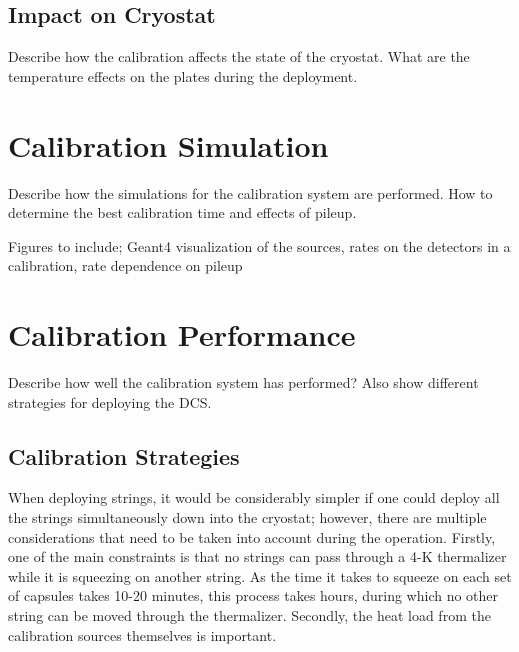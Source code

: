 \subsection{Impact on Cryostat}

Describe how the calibration affects the state of the cryostat. What are the temperature effects on the plates during the deployment.


\section{Calibration Simulation}
Describe how the simulations for the calibration system are performed. How to determine the best calibration time and effects of pileup.

Figures to include; Geant4 visualization of the sources, rates on the detectors in a calibration, rate dependence on pileup 

\section{Calibration Performance}

Describe how well the calibration system has performed? Also show different strategies for deploying the DCS.

\subsection{Calibration Strategies}

When deploying strings, it would be considerably simpler if one could deploy all the strings simultaneously down into the cryostat; however, there are multiple considerations that need to be taken into account during the operation.
Firstly, one of the main constraints is that no strings can pass through a 4-K thermalizer while it is squeezing on another string.
As the time it takes to squeeze on each set of capsules takes 10-20 minutes, this process takes hours, during which no other string can be moved through the thermalizer.
Secondly, the heat load from the calibration sources themselves is important.